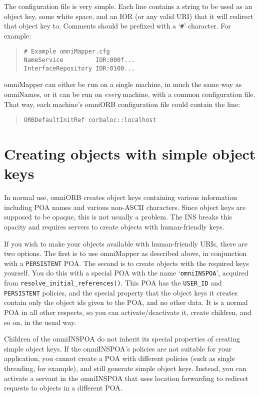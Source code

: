 \documentclass[11pt,twoside,a4paper]{book}
\newcommand{\code}[1]{\texttt{#1}}
\newcommand{\op}[1]{\texttt{#1()}}
\begin{document}
The configuration file is very simple. Each line contains a string to
be used as an object key, some white space, and an IOR (or any valid
URI) that it will redirect that object key to. Comments should be
prefixed with a `\texttt{\#}' character. For example:

\begin{quote}
\begin{verbatim}
# Example omniMapper.cfg
NameService         IOR:000f...
InterfaceRepository IOR:0100...
\end{verbatim}
\end{quote}

omniMapper can either be run on a single machine, in much the same way
as omniNames, or it can be run on \emph{every} machine, with a common
configuration file. That way, each machine's omniORB configuration
file could contain the line:

\begin{quote}
\begin{verbatim}
ORBDefaultInitRef corbaloc::localhost
\end{verbatim}
\end{quote}



\section{Creating objects with simple object keys}

In normal use, omniORB creates object keys containing various
information including POA names and various non-ASCII characters.
Since object keys are supposed to be opaque, this is not usually a
problem. The INS breaks this opacity and requires servers to create
objects with human-friendly keys.

If you wish to make your objects available with human-friendly URIs,
there are two options. The first is to use omniMapper as described
above, in conjunction with a \code{PERSISTENT} POA. The second is to
create objects with the required keys yourself. You do this with a
special POA with the name `\texttt{omniINSPOA}', acquired from
\op{resolve\_initial\_references}. This POA has the \code{USER\_ID}
and \code{PERSISTENT} policies, and the special property that the
object keys it creates contain only the object ids given to the POA,
and no other data. It is a normal POA in all other respects, so you
can activate/deactivate it, create children, and so on, in the usual
way.

Children of the omniINSPOA do not inherit its special properties of
creating simple object keys. If the omniINSPOA's policies are not
suitable for your application, you cannot create a POA with different
policies (such as single threading, for example), and still generate
simple object keys. Instead, you can activate a servant in the
omniINSPOA that uses location forwarding to redirect requests to
objects in a different POA.
\end{document}
